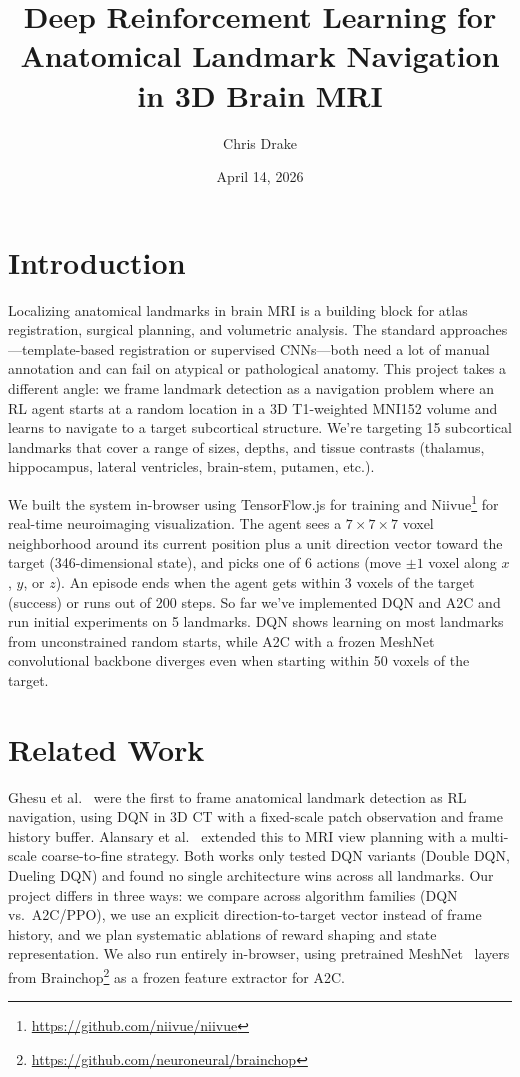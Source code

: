 \documentclass[11pt]{article}
\title{Deep Reinforcement Learning for Anatomical Landmark Navigation in 3D Brain MRI}
\author{Chris Drake}
\date{April 14, 2026}
\begin{document}
\maketitle

\section{Introduction}

Localizing anatomical landmarks in brain MRI is a building block for atlas registration, surgical planning, and volumetric analysis. The standard approaches---template-based registration or supervised CNNs---both need a lot of manual annotation and can fail on atypical or pathological anatomy. This project takes a different angle: we frame landmark detection as a navigation problem where an RL agent starts at a random location in a 3D T1-weighted MNI152 volume and learns to navigate to a target subcortical structure. We're targeting 15 subcortical landmarks that cover a range of sizes, depths, and tissue contrasts (thalamus, hippocampus, lateral ventricles, brain-stem, putamen, etc.).

We built the system in-browser using TensorFlow.js for training and Niivue\footnote{\url{https://github.com/niivue/niivue}} for real-time neuroimaging visualization. The agent sees a $7 \times 7 \times 7$ voxel neighborhood around its current position plus a unit direction vector toward the target (346-dimensional state), and picks one of 6 actions (move $\pm1$ voxel along $x$, $y$, or $z$). An episode ends when the agent gets within 3 voxels of the target (success) or runs out of 200 steps. So far we've implemented DQN and A2C and run initial experiments on 5 landmarks. DQN shows learning on most landmarks from unconstrained random starts, while A2C with a frozen MeshNet~\cite{brainchop2024} convolutional backbone diverges even when starting within 50 voxels of the target.

\section{Related Work}

Ghesu et al.~\cite{ghesu2019} were the first to frame anatomical landmark detection as RL navigation, using DQN in 3D CT with a fixed-scale patch observation and frame history buffer. Alansary et al.~\cite{alansary2018} extended this to MRI view planning with a multi-scale coarse-to-fine strategy. Both works only tested DQN variants (Double DQN, Dueling DQN) and found no single architecture wins across all landmarks. Our project differs in three ways: we compare across algorithm families (DQN vs.\ A2C/PPO), we use an explicit direction-to-target vector instead of frame history, and we plan systematic ablations of reward shaping and state representation. We also run entirely in-browser, using pretrained MeshNet~\cite{brainchop2024} layers from Brainchop\footnote{\url{https://github.com/neuroneural/brainchop}} as a frozen feature extractor for A2C.
\end{document}
